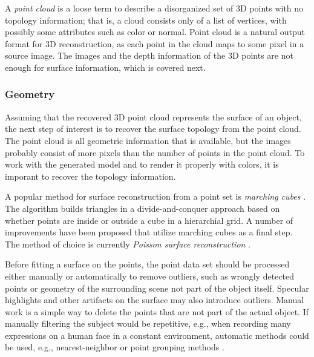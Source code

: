 A \emph{point cloud} is a loose term to describe a disorganized set of 3D points with no topology information; that is, a cloud consists only of a list of vertices, with possibly some attributes such as color or normal.
Point cloud is a natural output format for 3D reconstruction, as each point in the cloud maps to some pixel in a source image.
The images and the depth information of the 3D points are not enough for surface information, which is covered next.


\subsubsection{Geometry} %

Assuming that the recovered 3D point cloud represents the surface of an object, the next step of interest is to recover the surface topology from the point cloud.
The point cloud is all geometric information that is available, but the images probably consist of more pixels than the number of points in the point cloud.
To work with the generated model and to render it properly with colors, it is imporant to recover the topology information.

A popular method for surface reconstruction from a point set is \emph{marching cubes} \cite{lorensen1987marching}.
The algorithm builds triangles in a divide-and-conquer approach based on whether points are inside or outside a cube in a hierarchial grid.
A number of improvements have been proposed that utilize marching cubes as a final step.
The method of choice is currently \emph{Poisson surface reconstruction} \cite{kazhdan2006poisson,kazhdan2013screened}.

Before fitting a surface on the points, the point data set should be processed either manually or automatically to remove outliers, such as wrongly detected points or geometry of the surrounding scene not part of the object itself.
Specular highlights and other artifacts on the surface may also introduce outliers.
Manual work is a simple way to delete the points that are not part of the actual object.
If manually filtering the subject would be repetitive, e.g., when recording many expressions on a human face in a constant environment, automatic methods could be used, e.g., nearest-neighbor or point grouping methods \cite{pcl}.



